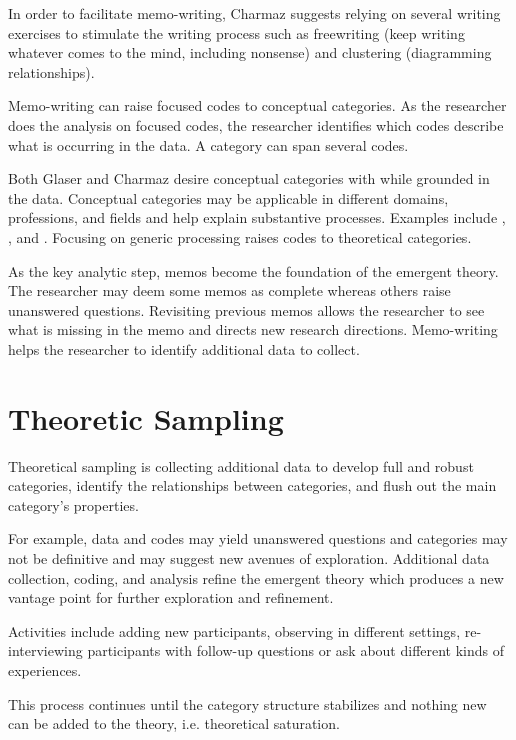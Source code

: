 In order to facilitate memo-writing, Charmaz suggests relying on several writing exercises to stimulate the writing process such as freewriting (keep writing whatever comes to the mind, including nonsense) and clustering (diagramming relationships).

Memo-writing can raise focused codes to conceptual categories. As the researcher does the analysis on focused codes, the researcher identifies which codes describe what is occurring in the data. A category can span several codes. 

Both Glaser and Charmaz desire conceptual categories with  \cite{Charmaz} while grounded in the data. Conceptual categories may be applicable in different domains, professions, and fields and help explain substantive processes. Examples include  \cite{KarabanowGettingOffTheStreet},  \cite{RiveraManagingSpoiledNationalIdentity}, and . Focusing on generic processing raises codes to theoretical categories. 

As the key analytic step, memos become the foundation of the emergent theory.  The researcher may deem some memos as complete whereas others raise unanswered questions. Revisiting previous memos allows the researcher to see what is missing in the memo and directs new research directions. Memo-writing helps the researcher to identify additional data to collect. 

\section{Theoretic Sampling}
Theoretical sampling is collecting additional data to develop full and robust categories, identify the relationships between categories, and flush out the main category's properties. 

For example, data and codes may yield unanswered questions and categories may not be definitive and may suggest new avenues of exploration. Additional data collection, coding, and analysis refine the emergent theory which produces a new vantage point for further exploration and refinement.

Activities include adding new participants, observing in different settings, re-interviewing participants with follow-up questions or ask about different kinds of experiences.

This process continues until the category structure stabilizes and nothing new can be added to the theory, i.e. theoretical saturation. 

